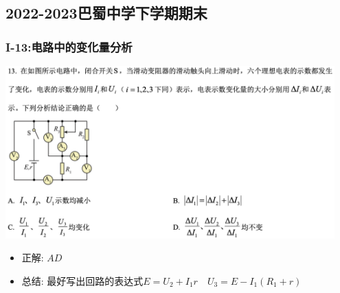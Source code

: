 \documentclass{article}
\begin{document}
\vspace{2em}


\subsection{2022-2023巴蜀中学下学期期末}
\subsubsection{I-13:电路中的变化量分析}
\includegraphics[width=0.95\textwidth,keepaspectratio]{./pictures/1.3-2.png}

\begin{itemize}
    \item 正解: \quad $AD$
    \item 总结: \quad 最好写出回路的表达式$E = U_{2} + I_{1}r  \quad U_{3} = E - I_{1}(R_{1} + r)$
\end{itemize}

\vspace{2em}
\end{document}
